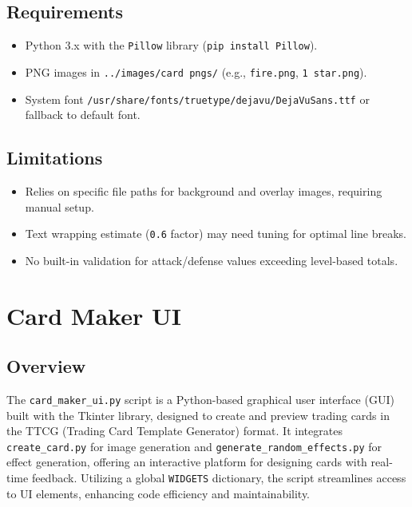 \subsection{Requirements}
\begin{itemize}
	\item Python 3.x with the \texttt{Pillow} library (\texttt{pip install Pillow}).
	\item PNG images in \texttt{../images/card pngs/} (e.g., \texttt{fire.png}, \texttt{1 star.png}).
	\item System font \texttt{/usr/share/fonts/truetype/dejavu/DejaVuSans.ttf} or fallback to default font.
\end{itemize}

\subsection{Limitations}
\begin{itemize}
	\item Relies on specific file paths for background and overlay images, requiring manual setup.
	\item Text wrapping estimate (\texttt{0.6} factor) may need tuning for optimal line breaks.
	\item No built-in validation for attack/defense values exceeding level-based totals.
\end{itemize}

















\section{Card Maker UI}
\label{sec:card_maker_ui}

\subsection{Overview}
The \texttt{card\_maker\_ui.py} script is a Python-based graphical user interface (GUI) built with the Tkinter library, designed to create and preview trading cards in the TTCG (Trading Card Template Generator) format. It integrates \texttt{create\_card.py} for image generation and \texttt{generate\_random\_effects.py} for effect generation, offering an interactive platform for designing cards with real-time feedback. Utilizing a global \texttt{WIDGETS} dictionary, the script streamlines access to UI elements, enhancing code efficiency and maintainability.

